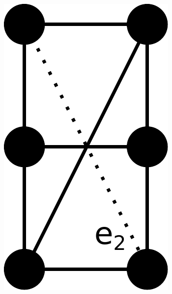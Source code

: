 \begin{figure}
\begin{subfigure}{.08\linewidth}
        \caption{}\label{fig:omd_k33_example:c}
    \end{subfigure}\hfill
    \begin{subfigure}{.08\linewidth}\centering
        \includegraphics[height=\myMinHeight]{../../img/svg/k33_omd_d}
        \caption{}\label{fig:omd_k33_example:d}
    \end{subfigure}\hspace{1cm}
    \begin{subfigure}{.08\linewidth}\centering

\end{subfigure}
\end{figure}
